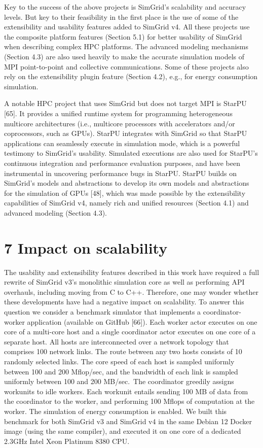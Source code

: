 \documentclass[
]{article}
\begin{document}
Key to the success of the above projects is SimGrid's scalability and
accuracy levels. But key to their feasibility in the first place is the
use of some of the extensibility and usability features added to SimGrid
v4. All these projects use the composite platform features (Section 5.1)
for better usability of SimGrid when describing complex HPC platforms.
The advanced modeling mechanisms (Section 4.3) are also used heavily to
make the accurate simulation models of MPI point-to-point and collective
communications. Some of these projects also rely on the extensibility
plugin feature (Section 4.2), e.g., for energy consumption simulation.

A notable HPC project that uses SimGrid but does not target MPI is
StarPU {[}65{]}. It provides a unified runtime system for programming
heterogeneous multicore architectures (i.e., multicore processors with
accelerators and/or coprocessors, such as GPUs). StarPU integrates with
SimGrid so that StarPU applications can seamlessly execute in simulation
mode, which is a powerful testimony to SimGrid's usability. Simulated
executions are also used for StarPU's continuous integration and
performance evaluation purposes, and have been instrumental in
uncovering performance bugs in StarPU. StarPU builds on SimGrid's models
and abstractions to develop its own models and abstractions for the
simulation of GPUs {[}48{]}, which was made possible by the
extensibility capabilities of SimGrid v4, namely rich and unified
resources (Section 4.1) and advanced modeling (Section 4.3).

\section{7 Impact on scalability}\label{impact-on-scalability}

The usability and extensibility features described in this work have
required a full rewrite of SimGrid v3's monolithic simulation core as
well as performing API overhauls, including moving from C to C++.
Therefore, one may wonder whether these developments have had a negative
impact on scalability. To answer this question we consider a benchmark
simulator that implements a coordinator-worker application (available on
GitHub {[}66{]}). Each worker actor executes on one core of a multi-core
host and a single coordinator actor executes on one core of a separate
host. All hosts are interconnected over a network topology that
comprises 100 network links. The route between any two hosts consists of
10 randomly selected links. The core speed of each host is sampled
uniformly between 100 and 200 Mflop/sec, and the bandwidth of each link
is sampled uniformly between 100 and 200 MB/sec.~The coordinator
greedily assigns workunits to idle workers. Each workunit entails
sending 100 MB of data from the coordinator to the worker, and
performing 100 Mflops of computation at the worker. The simulation of
energy consumption is enabled. We built this benchmark for both SimGrid
v3 and SimGrid v4 in the same Debian 12 Docker image (using the same
compiler), and executed it on one core of a dedicated 2.3GHz Intel Xeon
Platinum 8380 CPU.
\end{document}
